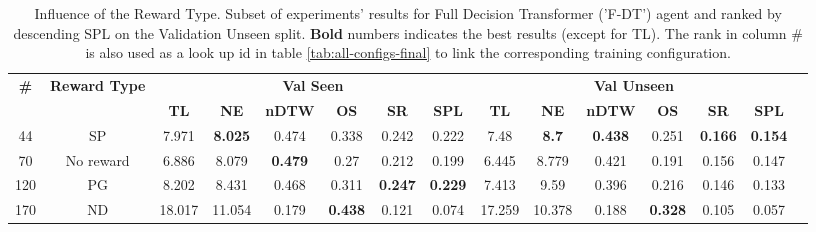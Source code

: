 \begin{table}
\centering
\caption{\label{tab:f_dt_reward_type}Influence of the Reward Type. Subset of experiments' results for Full Decision Transformer ('F-DT') agent and ranked by descending SPL on the Validation Unseen split. \textbf{Bold} numbers indicates the best results (except for TL). The rank in column \# is also used as a look up id in table \ref{tab:all-configs-final} to link the corresponding training configuration.}
\begin{tabular}{@{\hskip3pt}c@{\hskip3pt}c@{\hskip3pt}c@{\hskip3pt}c@{\hskip3pt}c@{\hskip3pt}c@{\hskip3pt}c@{\hskip3pt}c@{\hskip3pt}c@{\hskip3pt}c@{\hskip3pt}c@{\hskip3pt}c@{\hskip3pt}c@{\hskip3pt}c@{\hskip3pt}c}
\toprule
                                  \textbf{\#} & \textbf{Reward Type} & \multicolumn{6}{c}{\textbf{Val Seen}} & \multicolumn{6}{c}{\textbf{Val Unseen}} \\
\cmidrule(l){3-8}\cmidrule(l){9-14}\textbf{~} &           \textbf{~} &       \textbf{TL} &     \textbf{NE} &   \textbf{nDTW} &     \textbf{OS} &     \textbf{SR} &    \textbf{SPL} &         \textbf{TL} &   \textbf{NE} &   \textbf{nDTW} &     \textbf{OS} &     \textbf{SR} &    \textbf{SPL} \\
\midrule
                                           44 &                   SP &             7.971 &  \textbf{8.025} &           0.474 &           0.338 &           0.242 &           0.222 &                7.48 &  \textbf{8.7} &  \textbf{0.438} &           0.251 &  \textbf{0.166} &  \textbf{0.154} \\
                                           70 &            No reward &             6.886 &           8.079 &  \textbf{0.479} &            0.27 &           0.212 &           0.199 &               6.445 &         8.779 &           0.421 &           0.191 &           0.156 &           0.147 \\
                                          120 &                   PG &             8.202 &           8.431 &           0.468 &           0.311 &  \textbf{0.247} &  \textbf{0.229} &               7.413 &          9.59 &           0.396 &           0.216 &           0.146 &           0.133 \\
                                          170 &                   ND &            18.017 &          11.054 &           0.179 &  \textbf{0.438} &           0.121 &           0.074 &              17.259 &        10.378 &           0.188 &  \textbf{0.328} &           0.105 &           0.057 \\
\bottomrule
\end{tabular}
\end{table}
